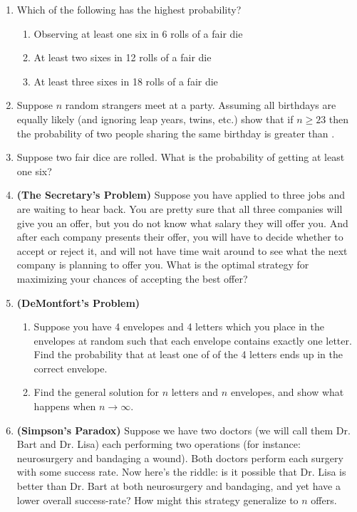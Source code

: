 \begin{enumerate}
    \item Which of the following has the highest probability?
    \begin{enumerate}
        \item Observing at least one six in 6 rolls of a fair die
        \item At least two sixes in 12 rolls of a fair die
        \item At least three sixes in 18 rolls of a fair die
    \end{enumerate}
    \item Suppose $n$ random strangers meet at a party. Assuming all birthdays are equally likely (and ignoring leap years, twins, etc.) show that if $n\ge 23$ then the probability of two people sharing the same birthday is greater than .
    \item Suppose two fair dice are rolled. What is the probability of getting at least one six?
    \item\textbf{(The Secretary's Problem)}
    Suppose you have applied to three jobs and are waiting to hear back. You are pretty sure that all three companies will give you an offer, but you do not know what salary they will offer you. And after each company presents their offer, you will have to decide whether to accept or reject it, and will not have time wait around to see what the next company is planning to offer you. What is the optimal strategy for maximizing your chances of accepting the best offer?
    \item \textbf{(DeMontfort's Problem)} 
    \begin{enumerate}
        \item Suppose you have 4 envelopes and 4 letters which you place in the envelopes at random such that each envelope contains exactly one letter. Find the probability that at least one of of the 4 letters ends up in the correct envelope.
        \item Find the general solution for $n$ letters and $n$ envelopes, and show what happens when $n\to\infty$.
    \end{enumerate}
    \item \textbf{(Simpson's Paradox)} Suppose we have two doctors (we will call them Dr. Bart and Dr. Lisa) each performing two operations (for instance: neurosurgery and bandaging a wound). Both doctors perform each surgery with some success rate. Now here's the riddle: is it possible that Dr. Lisa is better than Dr. Bart at both neurosurgery and bandaging, and yet have a lower overall success-rate? How might this strategy generalize to $n$ offers.
\end{enumerate}
